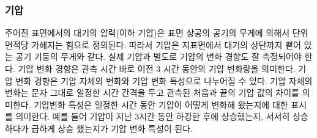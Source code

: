 \subsubsection{기압}

주어진 표면에서의 대기의 압력(이하 기압)은 표면 상공의 공기의 무게에 의해서 단위 면적당 가해지는 힘으로 정의된다. 따라서 기압은 지표면에서 대기의 상단까지 뻗어 있는 공기 기둥의 무게와 같다. 실제 기압과 별도로
기압의 변화 경향도 잘 측정되어야 한다. 기압 변화 경향은 관측 시간 바로 이전 3 시간 동안의 기압 변화량을 의미한다. 기압 변화 경향은 기압 자체의 변화와 기압 변화 특성으로 나누어질 수 있다. 기압 자체의 변화는 문자 그대로 일정한 시간 간격을 두고 관측된 처음과 끝의 기압 값의 차이를 의미한다. 기압변화 특성은 일정한 시간 동안 기압이 어떻게 변화해 왔는지에 대한 표시를 의미한다. 예를 들어 기압이 지난 3시간 동안 하강한 후에 상승했는지, 서서히 상승 하다가 급하게 상승 했는지가 기압 변화 특성이 된다.

